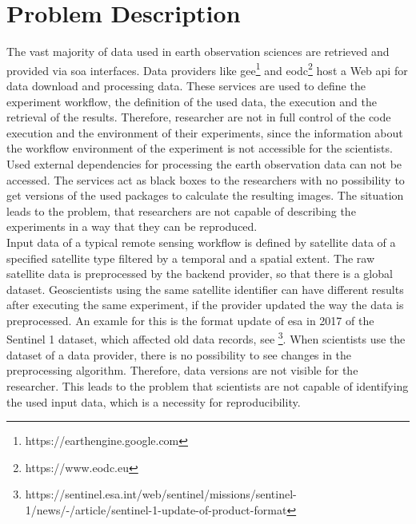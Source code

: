 \documentclass[draft,final]{vutinfth} %
\begin{document}
\section{Problem Description}\label{Problem}
The vast majority of data used in earth observation sciences are retrieved and provided via \gls{soa} interfaces. Data providers like \gls{gee}\footnote{https://earthengine.google.com} and \gls{eodc}\footnote{https://www.eodc.eu} host a Web \gls{api} for data download and processing data. These services are used to define the experiment workflow, the definition of the used data, the execution and the retrieval of the results. Therefore, researcher are not in full control of the code execution and the environment of their experiments, since the information about the workflow environment of the experiment is not accessible for the scientists. Used external dependencies for processing the earth observation data can not be accessed. The services act as black boxes to the researchers with no possibility to get versions of the used packages to calculate the resulting images. The situation leads to the problem, that researchers are not capable of describing the experiments in a way that they can be reproduced. \\
Input data of a typical remote sensing workflow is defined by satellite data of a specified satellite type filtered by a temporal and a spatial extent. The raw satellite data is preprocessed by the backend provider, so that there is a global dataset. Geoscientists using the same satellite identifier can have different results after executing the same experiment, if the provider updated the way the data is preprocessed. An examle for this is the format update of \gls{esa} in 2017 of the Sentinel 1 dataset, which affected old data records, see \footnote{https://sentinel.esa.int/web/sentinel/missions/sentinel-1/news/-/article/sentinel-1-update-of-product-format}. When scientists use the dataset of a data provider, there is no possibility to see changes in the preprocessing algorithm. Therefore, data versions are not visible for the researcher. This leads to the problem that scientists are not capable of identifying the used input data, which is a necessity for reproducibility. 
\end{document}
